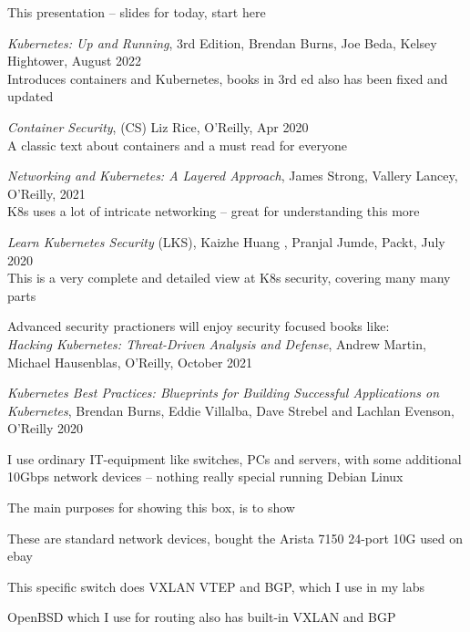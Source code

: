 \documentclass[Screen16to9,17pt]{foils}
\begin{document}

\begin{list2}
\item This presentation -- slides for today, start here
\item \emph{Kubernetes: Up and Running}, 3rd Edition, Brendan Burns, Joe Beda, Kelsey Hightower,
August 2022\\
Introduces containers and Kubernetes, books in 3rd ed also has been fixed and updated
\item \emph{Container Security}, (CS) Liz Rice, O'Reilly, Apr 2020\\
A classic text about containers and a must read for everyone
\item \emph{Networking and Kubernetes: A Layered Approach}, James Strong, Vallery Lancey, O'Reilly, 2021\\
K8s uses a lot of intricate networking -- great for understanding this more
\item \emph{Learn Kubernetes Security} (LKS), Kaizhe Huang , Pranjal Jumde, Packt, July 2020\\
This is a very complete and detailed view at K8s security, covering many many parts
\item Advanced security practioners will enjoy security focused books like:\\
\emph{Hacking Kubernetes: Threat-Driven Analysis and Defense}, Andrew Martin, Michael Hausenblas, O'Reilly, October 2021
\item \emph{Kubernetes Best Practices: Blueprints for Building Successful Applications on Kubernetes}, Brendan Burns, Eddie Villalba, Dave Strebel and Lachlan Evenson, O'Reilly 2020
\end{list2}



I use ordinary IT-equipment like switches, PCs and servers, with some additional 10Gbps network devices -- nothing really special running Debian Linux

The main purposes for showing this box, is to show
\begin{list2}
\item These are standard network devices, bought the Arista 7150 24-port 10G used on ebay
\item This specific switch does VXLAN VTEP and BGP, which I use in my labs
\item OpenBSD which I use for routing also has built-in VXLAN and BGP
\end{list2}
\end{document}
